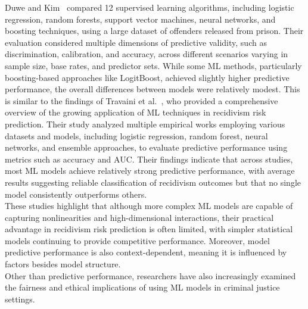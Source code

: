 \documentclass[12pt]{article}
\begin{document}
Duwe and Kim~\cite{duwe2017out} compared 12 supervised learning algorithms, including logistic regression, random forests, support vector machines, neural networks, and boosting techniques, using a large dataset of offenders released from prison. Their evaluation considered multiple dimensions of predictive validity, such as discrimination, calibration, and accuracy, across different scenarios varying in sample size, base rates, and predictor sets. While some ML methods, particularly boosting-based approaches like LogitBoost, achieved slightly higher predictive performance, the overall differences between models were relatively modest. This is similar to the findings of Travaini et al.~\cite{travaini2022machine}, who provided a comprehensive overview of the growing application of ML techniques in recidivism risk prediction. Their study analyzed multiple empirical works employing various datasets and models, including logistic regression, random forest, neural networks, and ensemble approaches, to evaluate predictive performance using metrics such as accuracy and AUC. Their findings indicate that across studies, most ML models achieve relatively strong predictive performance, with average results suggesting reliable classification of recidivism outcomes but that no single model consistently outperforms others.\\

These studies highlight that although more complex ML models are capable of capturing nonlinearities and high-dimensional interactions, their practical advantage in recidivism risk prediction is often limited, with simpler statistical models continuing to provide competitive performance. Moreover, model predictive performance is also context-dependent, meaning it is influenced by factors besides model structure.\\

Other than predictive performance, researchers have also increasingly examined the fairness and ethical implications of using ML models in criminal justice settings.\\
\end{document}
